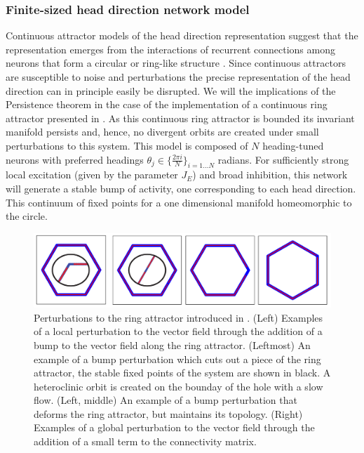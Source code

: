 \documentclass{article}
\newcounter{ct}
\theoremstyle{definition}
\theoremstyle{remark}
\begin{document}



\subsubsection{Finite-sized head direction network model}\label{sec:hd}
Continuous attractor models of the head direction representation suggest that the representation emerges from the interactions of recurrent connections among neurons that form a circular or ring-like structure \citep{zhang1996, noorman2022, ajabi2023}. 
Since continuous attractors are susceptible to noise and perturbations the precise representation of the head direction can in principle easily be disrupted.
We will the implications of the Persistence theorem in the case of the implementation of a continuous ring attractor presented in \citep{noorman2022}.
As this continuous ring attractor is bounded its invariant manifold persists and, hence, no divergent orbits are created under small perturbations to this system.
This model is composed of $N$ heading-tuned neurons  with preferred headings $\theta_j \in \{\frac{2\pi i}{N}\}_{i=1\dots N}$ radians.
For sufficiently strong local excitation (given by the parameter $J_E$) and broad inhibition, this network will generate a stable bump of activity, one corresponding to each head direction. This continuum of fixed points for a one dimensional manifold homeomorphic to the circle. 

\begin{figure}[H]
     \centering
  \includegraphics[width=\textwidth]{figures/noorman_perturbations}
       \caption{Perturbations to the ring attractor introduced in \citep{noorman2022}. (Left)  Examples of a local perturbation to the vector field through the addition of a bump to the vector field along the ring attractor.
       (Leftmost) An example of a bump perturbation which cuts out a piece of the ring attractor, the stable fixed points of the system are shown in black. A heteroclinic orbit is created on the bounday of the hole with a slow flow.
       (Left, middle) An example of a bump perturbation that deforms the ring attractor, but maintains its topology.
       (Right) Examples of a global perturbation to the vector field through the addition of a small term to the connectivity matrix. }
         \label{fig:noorman_ring_activity_pert}
\end{figure}
\end{document}
